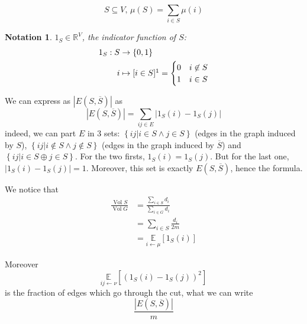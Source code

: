 \documentclass[12pt]{article}
\newtheorem{notation}{Notation}
\newcommand{\EE}{\mathbb{E}}
\newcommand{\RR}{\mathbb{R}}
\newcommand{\set}[1]{\left\{ #1 \right\}}
\newcommand{\la}{\leftarrow}
\newcommand{\card}[1]{\left\lvert#1\right\rvert}
\newcommand{\esp}[2][]{\underset{#1}{\EE}\left[ #2 \right]}
\DeclareMathOperator{\vol}{Vol}
\begin{document}
\[
    S\subseteq V,\, \mu(S) = \sum\limits_{i\in S} \mu(i)
\]

\begin{notation}
    $1_S \in \RR^V$, the indicator function of $S$:
    \[
        \begin{aligned}
            1_S: S &\to \set{0,1}\\
            i &\mapsto [i\in S]\footnotemark
            = \begin{cases}
                    0 & i\not\in S\\
                    1 & i\in S
                \end{cases}     
        \end{aligned}
    \]
\end{notation}

We can express as $\card{E(S,\overline{S})}$ as
\[
    \card{E(S,\overline{S})} = \sum\limits_{ij\in E} \lvert 1_S(i)-1_S(j)\rvert
\]
indeed, we can part $E$ in 3 sets: $\set{ij \vert i\in S \wedge j \in S}$ (edges in the graph induced by $S$), $\set{ij \vert i\not\in S \wedge j \not\in S}$ (edges in the graph induced by $\overline{S}$) and $\set{ij \vert i\in S \oplus j \in S}$. For the two firsts, $1_S(i) = 1_S(j)$. But for the last one, $\lvert 1_S(i) - 1_S(j)\rvert = 1$. Moreover, this set is exactly $E(S,\overline{S})$, hence the formula.

We notice that
\[
    \begin{aligned}
        \frac{\vol S}{\vol G} &= \frac{\sum\limits_{i\in S} d_i}{\sum\limits_{i\in G} d_i}\\
        &= \sum\limits_{i\in S}\frac{d_i}{2m}\\
        &= \esp[i\la\mu]{1_S(i)}
    \end{aligned}
\]

Moreover
\[
    \esp[ij\la\nu]{(1_S(i)-1_S(j))^2}
\]
is the fraction of edges which go through the cut, what we can write
\[
    \frac{\card{E(S,\overline{S})}}{m}
\]
\end{document}
